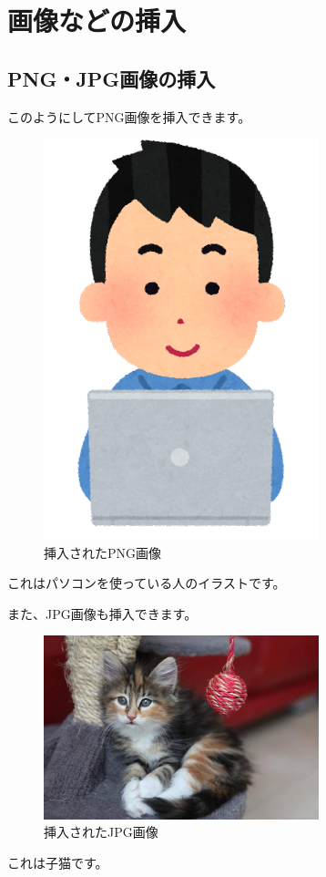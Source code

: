 \chapter{画像などの挿入}
\section{PNG・JPG画像の挿入}
このようにしてPNG画像を挿入できます。
\begin{figure}[H]
    \centering
    \includegraphics[width=8cm]{figures/computer_man1_smile.png}
    \caption{挿入されたPNG画像}
    \label{fig:png}
\end{figure}
これはパソコンを使っている人のイラストです。

また、JPG画像も挿入できます。
\begin{figure}[H]
    \centering
    \includegraphics[width=8cm]{figures/kitten.jpg}
    \caption{挿入されたJPG画像}
    \label{fig:jpg}
\end{figure}
これは子猫です。

